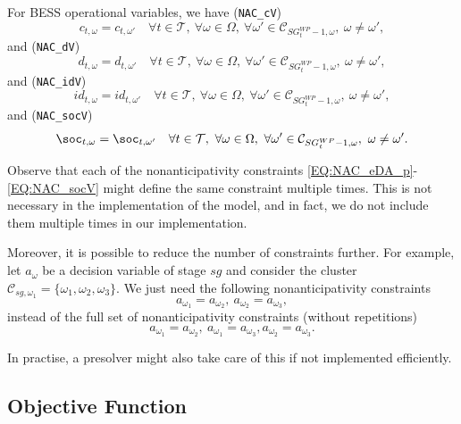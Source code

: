 For BESS operational variables, we have (\verb|NAC_cV|)
\begin{equation} \label{EQ:NAC_cV}
	c_{t, \omega} = c_{t, \omega'} \quad \forall t \in \mathcal{T}, \ \forall \omega \in \Omega, \ \forall \omega' \in \mathcal{C}_{SG^{WP}_t - 1, \omega}, \ \omega \neq \omega',
\end{equation}
and (\verb|NAC_dV|)
\begin{equation} \label{EQ:NAC_dV}
	d_{t, \omega} = d_{t, \omega'} \quad \forall t \in \mathcal{T}, \ \forall \omega \in \Omega, \ \forall \omega' \in \mathcal{C}_{SG^{WP}_t - 1, \omega}, \ \omega \neq \omega',
\end{equation}
and (\verb|NAC_idV|)
\begin{equation} \label{EQ:NAC_idV}
	id_{t, \omega} = id_{t, \omega'} \quad \forall t \in \mathcal{T}, \ \forall \omega \in \Omega, \ \forall \omega' \in \mathcal{C}_{SG^{WP}_t - 1, \omega}, \ \omega \neq \omega',
\end{equation}
and (\verb|NAC_socV|)
\begin{equation} \label{EQ:NAC_socV}
	\soc_{t, \omega} = \soc_{t, \omega'} \quad \forall t \in \mathcal{T}, \ \forall \omega \in \Omega, \ \forall \omega' \in \mathcal{C}_{SG^{WP}_t - 1, \omega}, \ \omega \neq \omega'.
\end{equation}

\begin{note}
Observe that each of the nonanticipativity constraints \eqref{EQ:NAC_eDA_p}-\eqref{EQ:NAC_socV} might define the same constraint multiple times. This is not necessary in the implementation of the model, and in fact, we do not include them multiple times in our implementation.
	
Moreover, it is possible to reduce the number of constraints further. For example, let $a_{\omega}$ be a decision variable of stage $sg$ and consider the cluster $\mathcal{C}_{sg, \omega_1} = \{ \omega_1, \omega_2, \omega_3 \}$. We just need the following nonanticipativity constraints 
$$
a_{\omega_1} = a_{\omega_2}, \ a_{\omega_2} = a_{\omega_3},
$$
instead of the full set of nonanticipativity constraints (without repetitions)
$$
a_{\omega_1} = a_{\omega_2}, \ a_{\omega_1} = a_{\omega_3}, a_{\omega_2} = a_{\omega_3}.
$$

In practise, a presolver might also take care of this if not implemented efficiently.	
\end{note}


\subsection{Objective Function}
\label{SEC:ObjectiveFunction}

